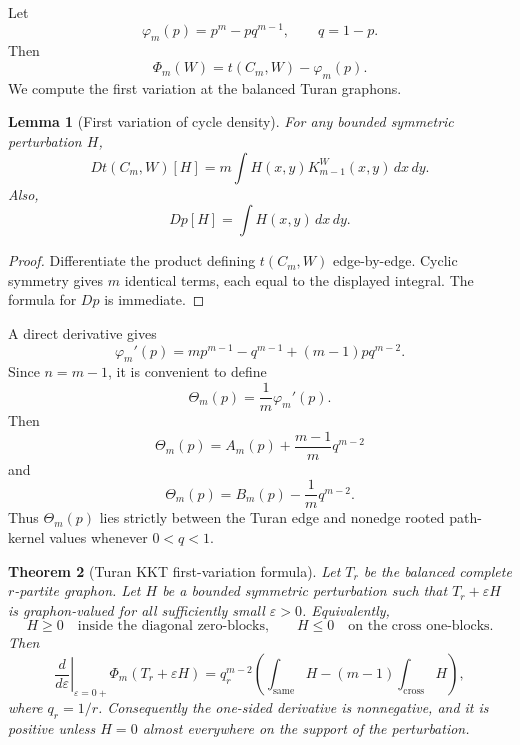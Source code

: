 \documentclass[11pt]{article}
\newtheorem{theorem}{Theorem}[section]
\newtheorem{lemma}[theorem]{Lemma}
\theoremstyle{definition}
\newcommand{\eps}{\varepsilon}
\newcommand{\same}{\mathrm{same}}
\newcommand{\cross}{\mathrm{cross}}
\newcommand{\dd}{\,d}
\begin{document}
Let
\[
        \varphi_m(p)=p^m-pq^{m-1},
        \qquad q=1-p.
\]
Then
\[
        \Phi_m(W)=t(C_m,W)-\varphi_m(p).
\]
We compute the first variation at the balanced Turan graphons.

\begin{lemma}[First variation of cycle density]
For any bounded symmetric perturbation $H$,
\[
        D t(C_m,W)[H]
        =m\int H(x,y)K_{m-1}^W(x,y)\dd x\dd y.
\]
Also,
\[
        Dp[H]=\int H(x,y)\dd x\dd y.
\]
\end{lemma}

\begin{proof}
Differentiate the product defining $t(C_m,W)$ edge-by-edge.  Cyclic symmetry gives $m$ identical terms, each equal to the displayed integral.  The formula for $Dp$ is immediate.
\end{proof}

A direct derivative gives
\[
        \varphi_m'(p)=mp^{m-1}-q^{m-1}+(m-1)pq^{m-2}.
\]
Since $n=m-1$, it is convenient to define
\[
        \Theta_m(p)=\frac1m\varphi_m'(p).
\]
Then
\[
        \Theta_m(p)=A_m(p)+\frac{m-1}{m}q^{m-2}
\]
and
\[
        \Theta_m(p)=B_m(p)-\frac1m q^{m-2}.
\]
Thus $\Theta_m(p)$ lies strictly between the Turan edge and nonedge rooted path-kernel values whenever $0<q<1$.

\begin{theorem}[Turan KKT first-variation formula]
Let $T_r$ be the balanced complete $r$-partite graphon.  Let $H$ be a bounded symmetric perturbation such that $T_r+\eps H$ is graphon-valued for all sufficiently small $\eps>0$.  Equivalently,
\[
        H\ge0\quad\text{inside the diagonal zero-blocks,}
        \qquad
        H\le0\quad\text{on the cross one-blocks.}
\]
Then
\[
        \left.\frac{d}{d\eps}\right|_{\eps=0+}\Phi_m(T_r+\eps H)
        =q_r^{m-2}\left(\int_{\same}H-(m-1)\int_{\cross}H\right),
\]
where $q_r=1/r$.
Consequently the one-sided derivative is nonnegative, and it is positive unless $H=0$ almost everywhere on the support of the perturbation.
\end{theorem}
\end{document}
